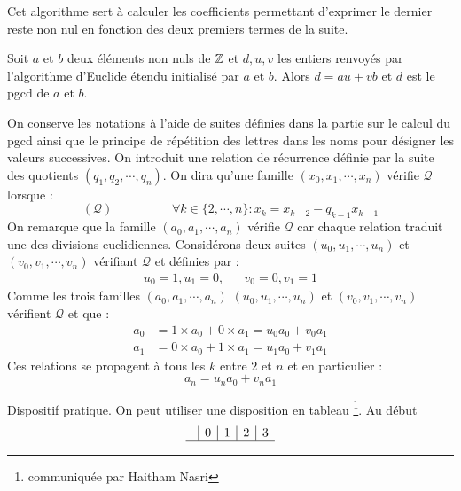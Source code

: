 \begin{propn}
Cet algorithme sert à calculer les coefficients permettant d'exprimer le dernier reste non nul en fonction des deux premiers termes de la suite.
\begin{propn}\label{coeff}
 Soit $a$ et $b$ deux éléments non nuls de $\mathbb{Z}$ et $d, u, v$ les entiers renvoyés par l'algorithme d'Euclide étendu initialisé par $a$ et $b$. Alors $d = au + vb$ et $d$ est le pgcd de $a$ et $b$. 
\end{propn}
\begin{demo}
On conserve les notations à l'aide de suites définies dans la partie sur le calcul du pgcd ainsi que le principe de répétition des lettres dans les noms pour désigner les valeurs successives.\newline
On introduit une relation de récurrence définie par la suite des quotients $(q_1,q_2,\cdots,q_n)$. On dira qu'une famille $(x_0,x_1,\cdots,x_n)$ vérifie $\mathcal Q$ lorsque :
\begin{displaymath}
 (\mathcal Q)\hspace{2cm} \forall k\in\{2,\cdots,n\} : x_k = x_{k-2}-q_{k-1}x_{k-1}
\end{displaymath}
On remarque que la famille $(a_0,a_1,\cdots,a_n)$ vérifie $\mathcal Q$ car chaque relation traduit une des divisions euclidiennes. Considérons deux suites $(u_0,u_1,\cdots,u_n)$ et $(v_0,v_1,\cdots,v_n)$ vérifiant $\mathcal Q$ et définies par :
\begin{align*}
 u_0=1, u_1=0,  & & v_0=0, v_1=1
\end{align*}
Comme les trois familles $(a_0,a_1,\cdots,a_n)$ $(u_0,u_1,\cdots,u_n)$ et $(v_0,v_1,\cdots,v_n)$ vérifient $\mathcal Q$ et que :
\begin{align*}
 a_0 &= 1\times a_0 + 0\times a_1 = u_0a_0 + v_0a_1 \\
 a_1 &= 0\times a_0 + 1\times a_1 = u_1a_0 + v_1a_1
\end{align*}
Ces relations se propagent à tous les $k$ entre $2$ et $n$ et en particulier :
\begin{displaymath}
 a_n = u_na_0 + v_na_1
\end{displaymath}
\end{demo}
Dispositif pratique. On peut utiliser une disposition en tableau \footnote{communiquée par Haitham Nasri}. Au début
\begin{displaymath}
\begin{array}{l|l|l|l|l}
 & 0 & 1 & 2 & 3 \\ \hline

\end{array}
\end{displaymath}
\end{propn}
